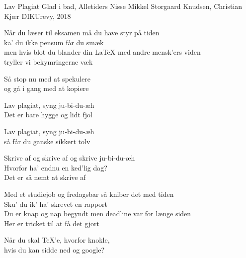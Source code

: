 \begin{song}{Lav Plagiat}
  {} %
  {Glad i bad, Alletiders Nisse} %
  {Mikkel Storgaard Knudsen, Christian Kjær} %
  {DIKUrevy, 2018} %
  {\NotCCLIed} %

  \begin{SBVerse}
    Når du læser til eksamen må du have styr på tiden \\
    ka' du ikke pensum får du smæk \\
    men hvis blot du blander din \LaTeX{} med andre mensk'ers viden \\
    tryller vi bekymringerne væk \\ \medskip
 
    Så stop nu med at spekulere \\
    og gå i gang med at kopiere \\
  \end{SBVerse}

  \begin{SBChorus}
    Lav plagiat, syng ju-bi-du-æh  \\
    Det er bare hygge og lidt fjol \\ \medskip
     
    Lav plagiat, syng ju-bi-du-æh \\
    så får du ganske sikkert tolv \\ \medskip
     
    Skrive af og skrive af og skrive ju-bi-du-æh \\
    Hvorfor ha' endnu en ked'lig dag? \\
    Det er så nemt at skrive af \\
  \end{SBChorus}
    
  \begin{SBVerse}
    Med et studiejob og fredagsbar så kniber det med tiden \\
    Sku' du ik' ha' skrevet en rapport \\
    Du er knap og nap begyndt men deadline var for længe siden \\
    Her er tricket til at få det gjort \\ \medskip

    Når du skal TeX'e, hvorfor knokle, \\
    hvis du kan sidde ned og google? \\
  \end{SBVerse}
    

\end{song}
